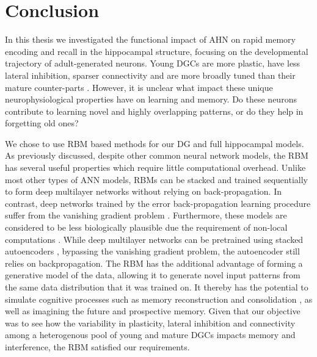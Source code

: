 \chapter{Conclusion}
\label{chap:conclusion}

In this thesis we investigated the functional impact of \ac{AHN} on 
rapid memory encoding and recall in the hippocampal structure, 
focusing on the developmental trajectory of adult-generated neurons. 
Young \acp{DGC} are more plastic, have less lateral inhibition, sparser connectivity and are
more broadly tuned than their mature counter-parts
\citep{enhanced_synaptic_plasticity,snyder-et-al-01,temprana-et-al-2015,determinants_of_sparse_activation,neurogenesis_dictating_the_tone,
marin-burgin-et-al-12}.
However, it is unclear what impact these unique neurophysiological properties 
have on learning and memory.
Do these neurons contribute to learning novel and highly overlapping patterns, or 
do they help in forgetting old ones?

We chose to use \ac{RBM} based methods for our \ac{DG} and full hippocampal 
models. 
As previously discussed, despite other common neural network models, 
the \ac{RBM} has several useful properties 
which require little computational overhead. 
Unlike most other types of 
\ac{ANN} models, \acp{RBM} can be stacked and trained sequentially to 
form deep multilayer networks without relying on back-propagation. 
In contrast, deep networks trained by the error back-propagation learning procedure 
\citep{lecun-85,rumelhart-hinton-williams-86}
suffer from the vanishing gradient problem \citep{vanishing_gradient}. 
Furthermore, these models are considered to be less biologically 
plausible due the requirement of non-local computations \citep{contrastive_learning}. 
While deep multilayer networks can be pretrained using 
stacked autoencoders \citep{stacked-autoencoders},
bypassing the vanishing gradient problem, the autoencoder 
still relies on backpropagation.
The \ac{RBM} has the additional advantage of forming a generative
model of the data, allowing it to generate novel input patterns from the same data
distribution that it was trained on. 
It thereby has the potential to simulate
cognitive processes such as memory reconstruction and consolidation \citep{kali-dayan-02},
as well as imagining the future and prospective memory. 
Given that our objective was to see how 
the variability in plasticity, lateral inhibition and connectivity 
among a heterogenous pool of young and mature \acp{DGC} 
impacts memory and interference, the \ac{RBM} satisfied our requirements.

